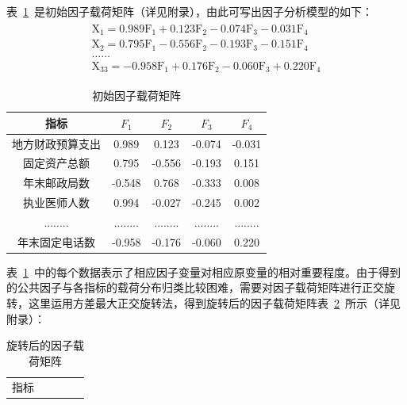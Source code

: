 \documentclass{whutmod}
\begin{document}
\begin{itemize}
	表~\ref{cehngfenjuzheng}~是初始因子载荷矩阵（详见附录），由此可写出因子分析模型的如下：
	\begin{gather}
	\begin{array} { l } { \mathrm { X } _ { 1 } = 0.989 \mathrm { F } _ { 1 } + 0.123 \mathrm { F } _ { 2 } - 0.074 \mathrm { F } _ { 3 } - 0.031 \mathrm { F } _ { 4 } } \\ { \mathrm { X } _ { 2 } = 0.795 \mathrm { F } _ { 1 } - 0.556 \mathrm { F } _ { 2 } - 0.193 \mathrm { F } _ { 3 } - 0.151 \mathrm { F } _ { 4 } } \\ { \ldots \ldots } \\ { \mathrm { X } _ { 33 } = - 0.958 \mathrm { F } _ { 1 } + 0.176 \mathrm { F } _ { 2 } - 0.060 \mathrm { F } _ { 3 } + 0.220 \mathrm { F } _ { 4 } } \end{array}
	\end{gather}
			\begin{table}[H]
	\centering
	\caption{初始因子载荷矩阵}\label{cehngfenjuzheng}
	\begin{tabular}{ccccc}
		\toprule[2pt]
		\multicolumn{1}{m{2cm}}{\centering 指标} &
		\multicolumn{1}{m{1cm}}{\centering $F_{1}$} & \multicolumn{1}{m{1cm}}{\centering $F_{2}$} & \multicolumn{1}{m{1cm}}{\centering $F_{3}$}&
		\multicolumn{1}{m{1cm}}{\centering $F_{4}$}\\
		\midrule[1pt]
		地方财政预算支出&0.989	 & 0.123 & -0.074&-0.031\\ 
		固定资产总额&0.795 &-0.556 &-0.193&0.151\\ 
		年末邮政局数&-0.548 &0.768  &-0.333&0.008\\ 
		执业医师人数&0.994 &-0.027 &-0.245 &0.002\\ 
		........& ........&  ........ &........ &........ \\ 
		年末固定电话数&-0.958 &-0.176   &-0.060 &0.220 \\
		\bottomrule[2pt]
	\end{tabular}
\end{table}
		表~\ref{cehngfenjuzheng}~中的每个数据表示了相应因子变量对相应原变量的相对重要程度。由于得到的公共因子与各指标的载荷分布归类比较困难，需要对因子载荷矩阵进行正交旋转，这里运用方差最大正交旋转法\cite{宋鸿2010城市人才吸引力的影响因素及提升对策}，得到旋转后的因子载荷矩阵表~\ref{xuanzhuanhuo}~所示（详见附录）：
			\begin{table}[H]
			\centering
			\caption{旋转后的因子载荷矩阵}\label{xuanzhuanhuo}
			\begin{tabular}{ccccc}
				\toprule[2pt]
				\multicolumn{1}{m{2cm}}{\centering 指标} &

\end{tabular}
\end{table}
\end{itemize}
\end{document}
